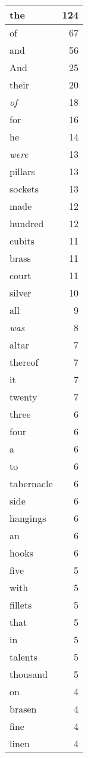 \begin{center}
\begin{longtable}{l|r}
\hline \hline
\endlastfoot
the & 124 \\ \hline
of & 67 \\ \hline
and & 56 \\ \hline
And & 25 \\ \hline
their & 20 \\ \hline
\emph{of} & 18 \\ \hline
for & 16 \\ \hline
he & 14 \\ \hline
\emph{were} & 13 \\ \hline
pillars & 13 \\ \hline
sockets & 13 \\ \hline
made & 12 \\ \hline
hundred & 12 \\ \hline
cubits & 11 \\ \hline
brass & 11 \\ \hline
court & 11 \\ \hline
silver & 10 \\ \hline
all & 9 \\ \hline
\emph{was} & 8 \\ \hline
altar & 7 \\ \hline
thereof & 7 \\ \hline
it & 7 \\ \hline
twenty & 7 \\ \hline
three & 6 \\ \hline
four & 6 \\ \hline
a & 6 \\ \hline
to & 6 \\ \hline
tabernacle & 6 \\ \hline
side & 6 \\ \hline
hangings & 6 \\ \hline
an & 6 \\ \hline
hooks & 6 \\ \hline
five & 5 \\ \hline
with & 5 \\ \hline
fillets & 5 \\ \hline
that & 5 \\ \hline
in & 5 \\ \hline
talents & 5 \\ \hline
thousand & 5 \\ \hline
on & 4 \\ \hline
brasen & 4 \\ \hline
fine & 4 \\ \hline
linen & 4 \\ \hline

\end{longtable}
\end{center}

